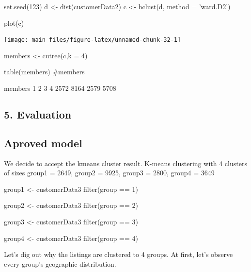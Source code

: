 \begin{Schunk}
\begin{Sinput}
set.seed(123)
d <- dist(customerData2)
c <- hclust(d, method = 'ward.D2')

plot(c)
\end{Sinput}


\begin{center}\texttt{[image: main\_files/figure-latex/unnamed-chunk-32-1]} \end{center}

\end{Schunk}

\begin{Schunk}
\begin{Sinput}
members <- cutree(c,k = 4)

table(members)
#members
\end{Sinput}
\begin{Soutput}
members
   1    2    3    4 
2572 8164 2579 5708 
\end{Soutput}
\end{Schunk}

\hypertarget{evaluation-1}{%
\subsection{5. Evaluation}\label{evaluation-1}}

\hypertarget{aproved-model-1}{%
\subsection{Aproved model}\label{aproved-model-1}}

We decide to accept the kmeans cluster result. K-means clustering with 4
clusters of sizes group1 = 2649, group2 = 9925, group3 = 2800, group4 =
3649

\begin{Schunk}
\begin{Sinput}
group1 <- customerData3 %
  filter(group == 1)

group2 <- customerData3 %
  filter(group == 2)

group3 <- customerData3 %
  filter(group == 3)

group4 <- customerData3 %
  filter(group == 4)
\end{Sinput}
\end{Schunk}

Let's dig out why the listings are clustered to 4 groups. At first,
let's observe every group's geographic distribution.

